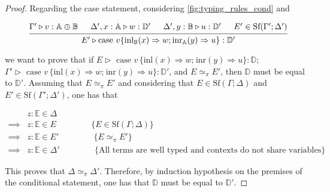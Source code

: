 \documentclass[10pt,a4paper]{amsart}
\theoremstyle{definition}
\theoremstyle{definition}
\theoremstyle{definition}
\theoremstyle{definition}
\theoremstyle{definition}
\theoremstyle{definition}
\begin{document}
\begin{proof}
Regarding the case statement, considering \autoref{fig:typing_rules_cond} and  


  \begin{figure} [H]
    \begin{equation*}
    \begin{aligned}
      \begin{prooftree}
          \hypo{\Gamma' \triangleright v: \mathbb{A} \oplus \mathbb{B}}
          \hypo{\Delta', x: \mathbb{A} \triangleright w: \mathbb{D}'}
          \hypo{\Delta', y: \mathbb{B} \triangleright u: \mathbb{D}'}
          \hypo{E' \in \text{Sf}(\Gamma'; \Delta')}
          \infer4[]{E' \triangleright \text{case } v \{\text{inl}_{\mathbb{B}}(x) \Rightarrow w ; \text{inr}_{\mathbb{A}}(y) \Rightarrow u\}: \mathbb{D}'}
          \end{prooftree}
    \end{aligned}
    \end{equation*}
    \end{figure}

we want to prove that if $E \triangleright \text{ case } v \hspace{2pt} \{\text{inl} (x) \Rightarrow w ; \hspace{1pt} \text{inr} (y) \Rightarrow u\}: \mathbb{D}$; $\Gamma'\triangleright \text{ case } v \hspace{2pt} \{\text{inl} (x) \Rightarrow w ; \hspace{1pt} \text{inr} (y) \Rightarrow u\}: \mathbb{D}'$, and $E \simeq_{\pi} E' $, then $\mathbb{D}$ must be equal to $\mathbb{D}'$. Assuming that  $E \simeq_{\pi} E' $ and considering that $E \in \text{Sf}(\Gamma;\Delta)$ and  $E' \in \text{Sf}(\Gamma';\Delta')$, one has that

\begin{align*}
  & z: \mathbb{E}  \in \Delta & \\
  \implies & z: \mathbb{E}  \in E \hspace{50pt} \{E \in \text{Sf}(\Gamma;\Delta)\} \\
  \implies & z: \mathbb{E} \in E' \hspace{50pt} \{ E \simeq_{\pi} E' \}  \\
  \implies & z: \mathbb{E}  \in \Delta' \hspace{50pt} \{\text{All terms are well typed and contexts do not share variables}\}
\end{align*}

This proves that $\Delta \simeq_{\pi} \Delta'$. Therefore, by induction hypothesis on the premises of the conditional statement, one has that $\mathbb{D}$ must be equal to $\mathbb{D}'$.
  


\end{proof}
\end{document}
